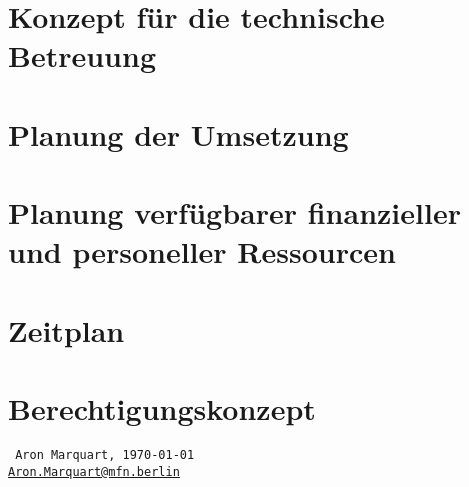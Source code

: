 \documentclass[11pt]{article}
\begin{document}
\section{Konzept für die technische Betreuung}

\section{Planung der Umsetzung}

\section{Planung verfügbarer finanzieller und personeller Ressourcen}

\section{Zeitplan}

\section{Berechtigungskonzept}


\vfill

{
    \raggedleft
    \tt
    {Aron Marquart, \today}\\
    \href{mailto:Aron.Marquart@mfn.berlin}{Aron.Marquart@mfn.berlin}\\
}
\end{document}
